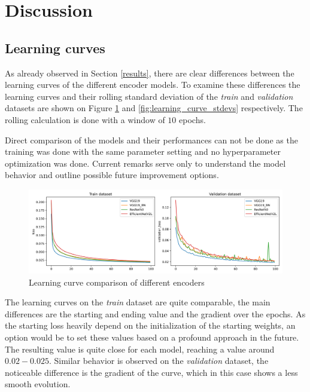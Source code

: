 \section{Discussion} \label{discussion}
\subsection{Learning curves}
As already observed in Section \ref{results}, there are clear differences between the
learning curves of the different encoder models.
To examine these differences the learning curves and their rolling standard deviation
of the \emph{train} and \emph{validation} datasets are shown on
Figure \ref{fig:learning_curves} and \ref{fig:learning_curve_stdevs} respectively.
The rolling calculation is done with a window of $10$ epochs.

Direct comparison of the models and their performances can not be done as the training
was done with the same parameter setting and no hyperparameter optimization was done.
Current remarks serve only to understand the model behavior and outline possible future
improvement options.

\begin{figure}[!ht]
    \centering
    \includegraphics[width=\textwidth]{./results/comparison/learning_curves.png}
    \caption{Learning curve comparison of different encoders}
    \label{fig:learning_curves}
\end{figure}

The learning curves on the \emph{train} dataset are quite comparable, the main differences are
the starting and ending value and the gradient over the epochs.
As the starting loss heavily depend on the initialization of the starting weights, an option
would be to set these values based on a profound approach in the future.
The resulting value is quite close for each model, reaching a value around $0.02 - 0.025$.
Similar behavior is observed on the \emph{validation} dataset, the noticeable
difference is the gradient of the curve, which in this case shows a less smooth evolution.

